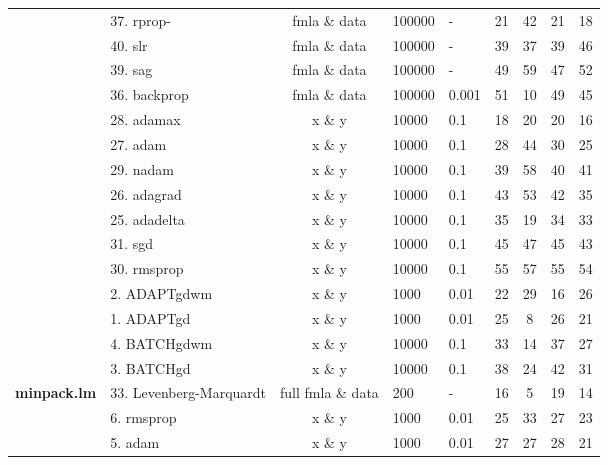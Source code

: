 \begin{Schunk}
\begin{table}
\begin{tabular}[t]{>{\bfseries}llcllcccc}
 & 37. rprop- & fmla \& data & 100000 & - & 21 & 42 & 21 & 18\\

 & 40. slr & fmla \& data & 100000 & - & 39 & 37 & 39 & 46\\

 & 39. sag & fmla \& data & 100000 & - & 49 & 59 & 47 & 52\\

\multirow{-5}{*}{\raggedright\arraybackslash neuralnet} & 36. backprop & fmla \& data & 100000 & 0.001 & 51 & 10 & 49 & 45\\
\cmidrule{1-9}
 & 28. adamax & x \& y & 10000 & 0.1 & 18 & 20 & 20 & 16\\

 & 27. adam & x \& y & 10000 & 0.1 & 28 & 44 & 30 & 25\\

 & 29. nadam & x \& y & 10000 & 0.1 & 39 & 58 & 40 & 41\\

 & 26. adagrad & x \& y & 10000 & 0.1 & 43 & 53 & 42 & 35\\

 & 25. adadelta & x \& y & 10000 & 0.1 & 35 & 19 & 34 & 33\\

 & 31. sgd & x \& y & 10000 & 0.1 & 45 & 47 & 45 & 43\\

\multirow{-7}{*}{\raggedright\arraybackslash keras} & 30. rmsprop & x \& y & 10000 & 0.1 & 55 & 57 & 55 & 54\\
\cmidrule{1-9}
 & 2. ADAPTgdwm & x \& y & 1000 & 0.01 & 22 & 29 & 16 & 26\\

 & 1. ADAPTgd & x \& y & 1000 & 0.01 & 25 & 8 & 26 & 21\\

 & 4. BATCHgdwm & x \& y & 10000 & 0.1 & 33 & 14 & 37 & 27\\

\multirow{-4}{*}{\raggedright\arraybackslash AMORE} & 3. BATCHgd & x \& y & 10000 & 0.1 & 38 & 24 & 42 & 31\\
\cmidrule{1-9}
minpack.lm & 33. Levenberg-Marquardt & full fmla \& data & 200 & - & 16 & 5 & 19 & 14\\
\cmidrule{1-9}
 & 6. rmsprop & x \& y & 1000 & 0.01 & 25 & 33 & 27 & 23\\

 & 5. adam & x \& y & 1000 & 0.01 & 27 & 27 & 28 & 21\\


\end{tabular}
\end{table}
\end{Schunk}
